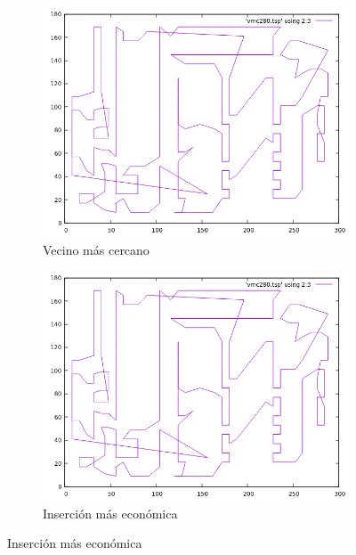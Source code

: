 \documentclass[12pt,spanish]{article}
\begin{document}
\begin{figure}[H]
\centering
\begin{subfigure}[b]{0.36\textwidth}
\includegraphics[width=\textwidth]{a280_vmc.png}
\caption{Vecino más cercano}
\end{subfigure}
\quad
\begin{subfigure}[b]{0.36\textwidth}
\includegraphics[width=\textwidth]{a280_vmc.png}
\caption{Inserción más económica}
\end{subfigure}

\vspace{1cm}


\end{figure}
\end{document}
